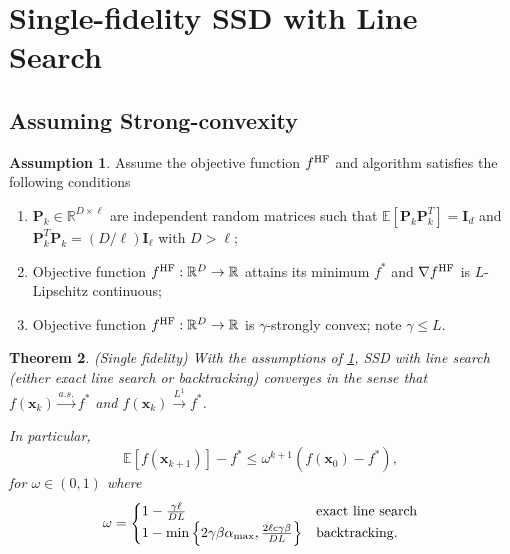 \documentclass[10pt]{article} %
\numberwithin{equation}{section}
\theoremstyle{plain}
\newtheorem{theorem}{Theorem} \numberwithin{theorem}{section}
\theoremstyle{definition}
\newtheorem{assumption}[theorem]{Assumption}
\newcommand{\<}{\langle}
\renewcommand{\>}{\rangle}
\renewcommand{\(}{\left(}
\renewcommand{\)}{\right)}
\renewcommand{\[}{\left[}
\renewcommand{\]}{\right]}
\def\R{{\mathbb R}}
\def\R{{\mathbb R}}
\newcommand{\HF}{\textup{HF}}
\newcommand{\alphaMax}{\alpha_\textup{max}}
\newcommand{\Lip}{L}
\begin{document}
\section{Single-fidelity SSD with Line Search}
\label{apdx:sf-ssd-ls}

\subsection{Assuming Strong-convexity}
\begin{assumption}
\label{asp:ssd}
Assume the objective function $f^\HF$ and algorithm satisfies the following conditions
\begin{enumerate}
    \item $\bm P_k\in\R^{D\times\ell}$ are independent random matrices such that $\mathbb{E}[\bm P_k\bm P_k^T] = \bm I_d$ and $\bm P_k^T\bm P_k = (D/\ell)\bm I_\ell$ with $D>\ell$;
    \item Objective function $f^\HF:\R^D\to\R$ attains its minimum $f^*$ and $\nabla f^\HF$ is $\Lip$-Lipschitz continuous;
    \item Objective function $f^\HF:\R^D\to\R$ is $\gamma$-strongly convex; note $\gamma \le \Lip$.
\end{enumerate}
\end{assumption}
\begin{theorem}
\label{thm:sf-sc}
(Single fidelity) With the assumptions of \ref{asp:ssd},  SSD with line search (either exact line search or backtracking) converges in the sense that $f(\bm x_k)\overset{a.s.}{\to}f^*$ and $f(\bm x_k)\overset{L^1}{\to}f^*$.

In particular,
\begin{equation}
\mathbb{E}[f(\bm x_{k+1})] - f^* \leq  \omega^{k+1}(f(\bm{x}_0) - f^*),
\end{equation}
for $\omega\in(0,1)$ where
\begin{align*}
\omega = \begin{cases} 1-\frac{\gamma\ell}{D\Lip} & \text{exact line search} \\
1-\min\left\{2\gamma\beta \alphaMax,\frac{2\ell c\gamma\beta}{D\Lip}\right\} & \text{backtracking}.
\end{cases}
\end{align*}


\end{theorem}
\end{document}
